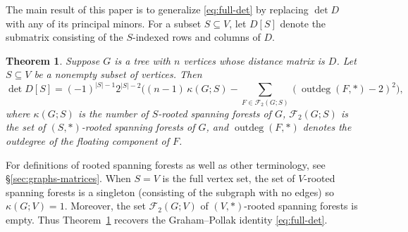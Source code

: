 \documentclass[12pt]{amsart}
\newtheorem{thm}{Theorem}[section]
\theoremstyle{definition}
\newcommand{\forests}{\mathcal{F}}
\DeclareMathOperator{\outdeg}{outdeg}
\begin{document}
The main result of this paper is to generalize \eqref{eq:full-det} by replacing $\det D$ with any of its principal minors.
For a subset $S \subseteq V$, let $D[S]$ denote the submatrix consisting of the $S$-indexed rows and columns of $D$.
\begin{thm}
\label{thm:main}
Suppose $G$ is a tree with $n$ vertices whose distance matrix is $D$.
Let $S \subseteq V$ be a nonempty subset of vertices.
Then
\begin{equation}\label{eq:main}
	\det D[S] = (-1)^{|S|-1} 2^{|S|-2} \Big( (n-1)\, \kappa(G;S)  - \!\!\! \sum_{F \in \forests_2(G;S)} \left(\outdeg(F,*) - 2\right)^2  \Big),
\end{equation}
where 
$\kappa(G;S)$ is the number of $S$-rooted spanning forests of $G$,
$\forests_2(G;S)$ is the set of $(S,*)$-rooted spanning forests of $G$,
and
$\outdeg(F,*)$ denotes the outdegree of the floating component of $F$.
\end{thm}
For definitions of rooted spanning forests as well as other terminology, see \S\ref{sec:graphs-matrices}.
When $S = V$ is the full vertex set, the set of $V$-rooted spanning forests is a singleton (consisting of the subgraph with no edges) so $\kappa(G; V) = 1$. Moreover, the set $\forests_2(G; V)$ of $(V, *)$-rooted spanning forests is empty. 
Thus Theorem~\ref{thm:main} recovers the Graham--Pollak identity \eqref{eq:full-det}.
\end{document}
